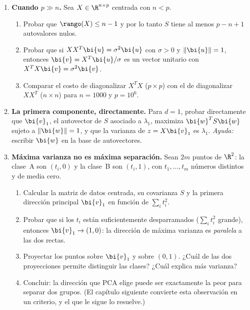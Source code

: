 \begin{enumerate}[leftmargin=*,label=\textbf{\thechapter.\arabic*},ref=\thechapter.\arabic*,itemsep=4pt]
\item {} \textbf{Cuando $p\gg n$.} Sea $X\in\R^{n\times p}$
centrada con $n<p$.
\begin{enumerate}[label=(\alph*)]
\item Probar que $\rango(X)\le n-1$ y por lo tanto $S$ tiene al menos $p-n+1$
autovalores nulos.
\item Probar que si $XX^T \bi{u}=\sigma^2\bi{u}$ con $\sigma>0$ y $\|\bi{u}\|=1$,
entonces $\bi{v}=X^T \bi{u}/\sigma$ es un vector unitario con $X^T X\bi{v}=\sigma^2\bi{v}$.
\item Comparar el costo de diagonalizar $X^T X$ ($p\times p$) con el de
diagonalizar $XX^T$ ($n\times n$) para $n=1000$ y $p=10^6$.
\end{enumerate}

\item {} \textbf{La primera componente, directamente.} Para
$d=1$, probar directamente que $\bi{v}_1$, el autovector de $S$ asociado a
$\lambda_1$, maximiza $\bi{w}^T S\bi{w}$ sujeto a $\|\bi{w}\|=1$, y que la varianza de
$z=X\bi{v}_1$ es $\lambda_1$. \emph{Ayuda:} escribir $\bi{w}$ en la base de
autovectores.

\item {} \textbf{Máxima varianza no es máxima
separación.}\label{pca-ej:separacion} Sean $2m$ puntos de $\R^2$: la clase~A
son $(t_i,0)$ y la clase~B son $(t_i,1)$, con $t_1,\dots,t_m$ números
distintos y de media cero.
\begin{enumerate}[label=(\alph*)]
\item Calcular la matriz de datos centrada, su covarianza $S$ y la primera
dirección principal $\bi{v}_1$ en función de $\sum_it_i^2$.
\item Probar que si los $t_i$ están suficientemente desparramados
($\sum_it_i^2$ grande), entonces $\bi{v}_1\to(1,0)$: la dirección de máxima
varianza es \emph{paralela} a las dos rectas.
\item Proyectar los puntos sobre $\bi{v}_1$ y sobre $(0,1)$. ¿Cuál de las dos
proyecciones permite distinguir las clases? ¿Cuál explica más varianza?
\item Concluir: la dirección que PCA elige puede ser exactamente la peor para
separar dos grupos. (El capítulo siguiente convierte esta observación en un
criterio, y el que le sigue lo resuelve.)
\end{enumerate}


\end{enumerate}

